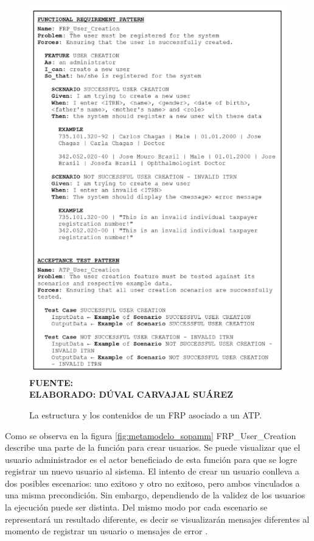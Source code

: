 \begin{figure}[h!]
	\caption{La estructura y los contenidos de un FRP asociado a un ATP.}
	\includegraphics[width=15cm]{img/metamodelo.png}
	\label{fig:metamodelo}
	\textbf{\\ FUENTE: \cite{Mohamed} \\ ELABORADO: DÚVAL CARVAJAL SUÁREZ}
\end{figure}

Como se observa en la figura \ref{fig:metamodelo_sopamm} FRP\_User\_Creation describe una parte de la función para crear usuarios. Se puede visualizar que el usuario administrador es el actor beneficiado de esta función para que se logre registrar un nuevo usuario al sistema. El intento de crear un usuario conlleva a dos posibles escenarios: uno exitoso y otro no exitoso, pero ambos vinculados a una misma precondición.  Sin embargo, dependiendo de la validez de los usuarios la ejecución puede ser distinta. Del mismo modo por cada escenario se representará un resultado diferente, es decir se visualizarán mensajes diferentes al momento de registrar un usuario o mensajes de error \cite{Mohamed}.

